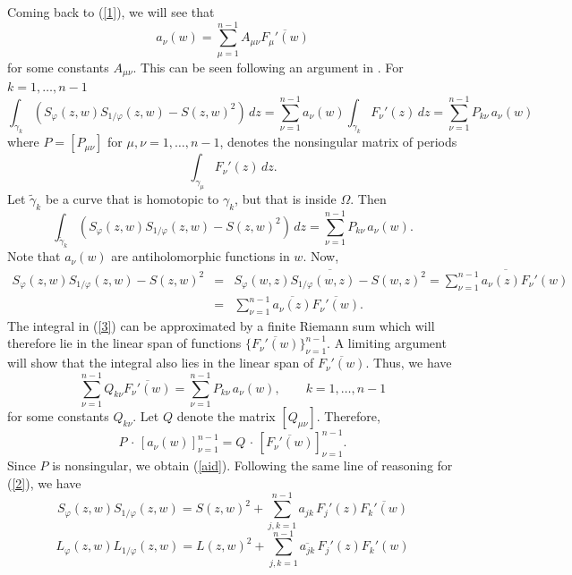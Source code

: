 \documentclass[11pt, reqno]{amsart}
\numberwithin{equation}{section}
\newcommand{\Om}{\Omega}
\begin{document}
Coming back to (\ref{1}), we will see that
\begin{equation}\label{aid}
a_{\nu}(w) = \sum_{\mu=1}^{n-1} A_{\mu\nu}\overline{F_{\mu}'(w)}
\end{equation}
for some constants $A_{\mu\nu}$. This can be seen following an argument in \cite[see page 137]{Be0}. For $k=1,\ldots,n-1$
\[
\int_{\gamma_{k}} (S_{\varphi}(z,w) S_{1/\varphi}(z,w) - S(z,w)^2 ) \,dz
=
\sum_{\nu=1}^{n-1}a_{\nu}(w)\int_{\gamma_{k}} F_{\nu}'(z)\,dz 
=
\sum_{\nu=1}^{n-1} P_{k\nu} \,a_{\nu}(w)
\]
where $P=[P_{\mu\nu}]$ for $\mu,\nu=1,\ldots,n-1$, denotes the nonsingular matrix of periods 
\[
\int_{\gamma_{\mu}} F_{\nu}'(z) \,dz.
\]
Let $\tilde{\gamma}_{k}$ be a curve that is homotopic to $\gamma_{k}$, but that is inside $\Om$. Then
\begin{equation}\label{3}
\int_{\tilde{\gamma}_{k}} (S_{\varphi}(z,w) S_{1/\varphi}(z,w) - S(z,w)^2 ) \,dz
=
\sum_{\nu=1}^{n-1} P_{k\nu} \,a_{\nu}(w).
\end{equation}
Note that $a_{\nu}(w)$ are antiholomorphic functions in $w$. Now,
\begin{eqnarray*}
S_{\varphi}(z,w) S_{1/\varphi}(z,w) - S(z,w)^2 
&=& 
\overline{S_{\varphi}(w,z) S_{1/\varphi}(w,z) - S(w,z)^2}
= \overline{\sum_{\nu=1}^{n-1} a_{\nu}(z) F_{\nu}'(w)} 
\\&=& \sum_{\nu=1}^{n-1} \overline{a_{\nu}(z)} \overline{F_{\nu}'(w)}.
\end{eqnarray*}
The integral in (\ref{3}) can be approximated by a finite Riemann sum which will therefore lie in the linear span of functions $\{\overline{F_{\nu}'(w)}\}_{\nu=1}^{n-1}$. A limiting argument will show that the integral also lies in the linear span of $\overline{F_{\nu}'(w)}$. Thus, we have
\[
\sum_{\nu=1}^{n-1} Q_{k\nu} \overline{F_{\nu}'(w)} = 
\sum_{\nu=1}^{n-1} P_{k\nu} \,a_{\nu}(w),
\quad \quad k=1,\ldots,n-1
\]
for some constants $Q_{k\nu}$. Let $Q$ denote the matrix $[Q_{\mu\nu}]$. Therefore,
\[
P \,\cdot\,[a_{\nu}(w)]_{\nu=1}^{n-1}  = Q \,\cdot\,[\overline{F_{\nu}'(w)}]_{\nu=1}^{n-1}.
\]
Since $P$ is nonsingular, we obtain (\ref{aid}).
Following the same line of reasoning for (\ref{2}), we have
\begin{equation}\label{Neq4}
	S_{\varphi}(z,w) S_{1/\varphi}(z,w) = S(z,w)^2 + \sum_{j,k=1}^{n-1} a_{jk}\,F_{j}'(z)\overline{F_k'(w)}
\end{equation}
\begin{equation}\label{Neq5}
	L_{\varphi}(z,w) L_{1/\varphi}(z,w) = L(z,w)^2 + \sum_{j,k=1}^{n-1} \overline{a_{jk}}\, F_{j}'(z) F_{k}'(w) 
\end{equation}
\end{document}
